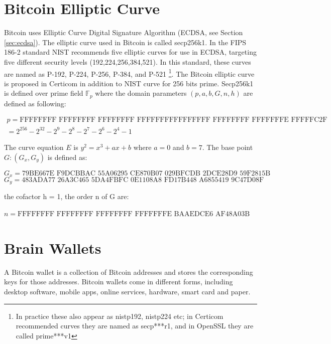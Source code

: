 \section{Bitcoin Elliptic Curve} \label{sec:seckp256k1}
Bitcoin uses Elliptic Curve Digital Signature Algorithm (ECDSA, see Section \ref{sec:ecdsa}). The elliptic curve used in Bitcoin is called secp256k1. In the FIPS 186-2 standard \cite{fips2000186} NIST recommends five elliptic curves for use in ECDSA, targeting five different security levels (192,224,256,384,521). In this standard, these curves are named as P-192, P-224, P-256, P-384, and P-521 \footnote{In practice these also appear as nistp192, nistp224 etc; in Certicom recommended curves they are named as secp***r1, and in OpenSSL they are called prime***v1}. The Bitcoin elliptic curve is proposed in Certicom \cite{certicom2000sec} in addition to NIST curve for 256 bits prime. Secp256k1 is defined over prime field $\mathbb{F}_p$ where the domain parameters $(p,a,b,G,n,h)$ are defined as following:
\begin{footnotesize}
	\begin{multline} \nonumber
	p = \text{FFFFFFFF FFFFFFFF FFFFFFFF FFFFFFFF} \text{FFFFFFFF FFFFFFFF FFFFFFFE FFFFFC2F} \\
	= 2^{256} - 2^{32} - 2^9 - 2^8 - 2^7 - 2^6 - 2^4 - 1 
	\end{multline}
\end{footnotesize}
The curve equation $E$ is $y^2 = x^3 + ax +b $ where $a = 0$ and $b = 7$. The base point $G:(G_x,G_y)$ is defined as:
\begin{footnotesize}
	$$G_x = \text{79BE667E F9DCBBAC 55A06295 CE870B07 029BFCDB 2DCE28D9 59F2815B 16F81798} $$ 
	$$G_y = \text{483ADA77 26A3C465 5DA4FBFC 0E1108A8 FD17B448 A6855419 9C47D08F FB10D4B8}$$
\end{footnotesize}
the cofactor h = 1, the order n of G are: \\
\begin{footnotesize}
	$n = \text{FFFFFFFF FFFFFFFF FFFFFFFF FFFFFFFE BAAEDCE6 AF48A03B BFD25E8C D0364141}$
\end{footnotesize}

\section{Brain Wallets} \label{sec:brainWallet}
A Bitcoin wallet is a collection of Bitcoin addresses and stores the corresponding keys for those addresses. Bitcoin wallets come in different forms, including desktop software, mobile apps, online services, hardware, smart card and paper. 


